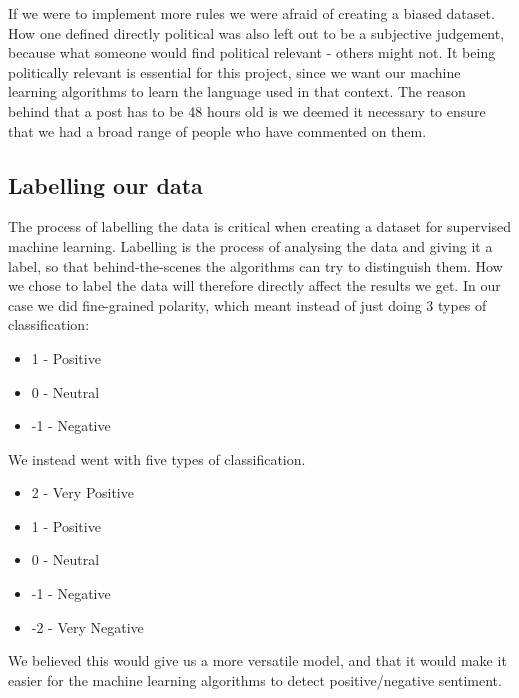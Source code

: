 If we were to implement more rules we were afraid of creating a biased dataset. How one defined directly political was also left out to be a subjective judgement, because what someone would find political relevant - others might not. It being politically relevant is essential for this project, since we want our machine learning algorithms to learn the language used in that context. The reason behind that a post has to be 48 hours old is we deemed it necessary to ensure that we had a broad range of people who have commented on them.


\subsection{Labelling our data} \label{labelling}

The process of labelling the data is critical when creating a dataset for supervised machine learning. Labelling is the process of analysing the data and giving it a label, so that behind-the-scenes the algorithms can try to distinguish them. How we chose to label the data will therefore directly affect the results we get. In our case we did fine-grained polarity, which meant instead of just doing 3 types of classification:
\begin{itemize}
	\item 1 - Positive
	\item 0 - Neutral
	\item -1 - Negative
\end{itemize}
We instead went with five types of classification.
\begin{itemize}
	\item 2 - Very Positive
	\item 1 - Positive
	\item 0 - Neutral
	\item -1 - Negative
	\item -2 - Very Negative
\end{itemize}
We believed this would give us a more versatile model, and that it would make it easier for the machine learning algorithms to detect positive/negative sentiment. 

